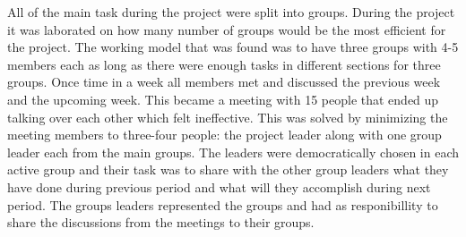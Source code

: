 


All of the main task during the project were split into groups. During the project it was laborated on how many number of groups would be the most efficient for the project. The working model that was found was to have three groups with 4-5 members each as long as there were enough tasks in different sections for three groups. Once time in a week all members met and discussed the previous week and the upcoming week. This became a meeting with 15 people that ended up talking over each other which felt ineffective. This was solved by minimizing the meeting members to three-four people: the project leader along with one group leader each from the main groups. The leaders were democratically chosen in each active group and their task was to share with the other group leaders what they have done during previous period and what will they accomplish during next period. The groups leaders represented the groups and had as responibillity to share the discussions from the meetings to their groups.




